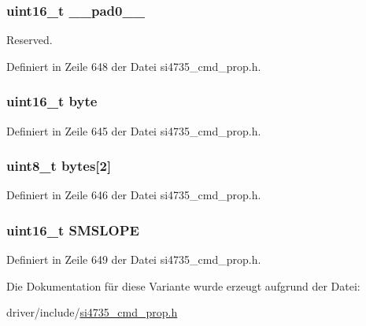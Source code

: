 \subsubsection[{\+\_\+\+\_\+pad0\+\_\+\+\_\+}]{\setlength{\rightskip}{0pt plus 5cm}uint16\+\_\+t \+\_\+\+\_\+pad0\+\_\+\+\_\+}\label{unionfm__soft__mute__slope_a77132c2c26a75f5b8751b235cda23828}


Reserved. 



Definiert in Zeile 648 der Datei si4735\+\_\+cmd\+\_\+prop.\+h.

\hypertarget{unionfm__soft__mute__slope_ab0549c1b5ea980a02e7eab77e21fea49}{}
\subsubsection[{byte}]{\setlength{\rightskip}{0pt plus 5cm}uint16\+\_\+t byte}\label{unionfm__soft__mute__slope_ab0549c1b5ea980a02e7eab77e21fea49}


Definiert in Zeile 645 der Datei si4735\+\_\+cmd\+\_\+prop.\+h.

\hypertarget{unionfm__soft__mute__slope_a46e4c05d20a047ec169f60d3167e912e}{}
\subsubsection[{bytes}]{\setlength{\rightskip}{0pt plus 5cm}uint8\+\_\+t bytes\mbox{[}2\mbox{]}}\label{unionfm__soft__mute__slope_a46e4c05d20a047ec169f60d3167e912e}


Definiert in Zeile 646 der Datei si4735\+\_\+cmd\+\_\+prop.\+h.

\hypertarget{unionfm__soft__mute__slope_a8a31c13b7632cb2f54277566150f231c}{}
\subsubsection[{S\+M\+S\+L\+O\+P\+E}]{\setlength{\rightskip}{0pt plus 5cm}uint16\+\_\+t S\+M\+S\+L\+O\+P\+E}\label{unionfm__soft__mute__slope_a8a31c13b7632cb2f54277566150f231c}


Definiert in Zeile 649 der Datei si4735\+\_\+cmd\+\_\+prop.\+h.



Die Dokumentation für diese Variante wurde erzeugt aufgrund der Datei\+:\begin{DoxyCompactItemize}
\item 
driver/include/\hyperlink{si4735__cmd__prop_8h}{si4735\+\_\+cmd\+\_\+prop.\+h}\end{DoxyCompactItemize}
